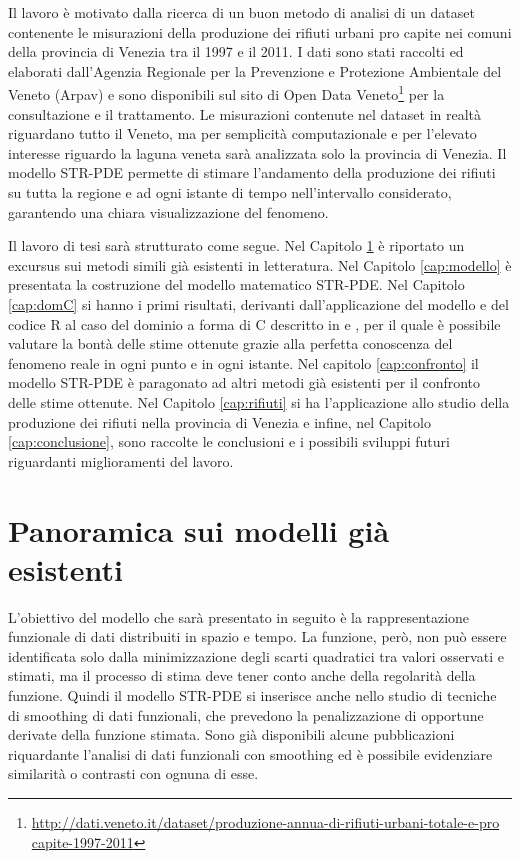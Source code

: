 \documentclass[a4paper,11pt,twoside,openright]{book}							%
\begin{document}
Il lavoro è motivato dalla ricerca di un buon metodo di analisi di un dataset contenente le misurazioni della produzione dei rifiuti urbani pro capite nei comuni della provincia di Venezia tra il 1997 e il 2011. I dati sono stati raccolti ed elaborati dall'Agenzia Regionale per la Prevenzione e Protezione Ambientale del Veneto (Arpav) e sono disponibili sul sito di Open Data Veneto\footnote{\href{http://dati.veneto.it/dataset/produzione-annua-di-rifiuti-urbani-totale-e-pro capite-1997-2011}{http://dati.veneto.it/dataset/produzione-annua-di-rifiuti-urbani-totale-e-pro capite-1997-2011}} per la consultazione e il trattamento. Le misurazioni contenute nel dataset in realtà riguardano tutto il Veneto, ma per semplicità computazionale e per l'elevato interesse riguardo la laguna veneta sarà analizzata solo la provincia di Venezia. Il modello STR-PDE permette di stimare l'andamento della produzione dei rifiuti su tutta la regione e ad ogni istante di tempo nell'intervallo considerato, garantendo una chiara visualizzazione del fenomeno.

Il lavoro di tesi sarà strutturato come segue. Nel Capitolo \ref{cap:panoramica} è riportato un excursus sui metodi simili già esistenti in letteratura. Nel Capitolo \ref{cap:modello} è presentata la costruzione del modello matematico STR-PDE. Nel Capitolo \ref{cap:domC} si hanno i primi risultati, derivanti dall'applicazione del modello e del codice R al caso del dominio a forma di C descritto in \cite{art:ramsay} e \cite{art:wood}, per il quale è possibile valutare la bontà delle stime ottenute grazie alla perfetta conoscenza del fenomeno reale in ogni punto e in ogni istante. Nel capitolo \ref{cap:confronto} il modello STR-PDE è paragonato ad altri metodi già esistenti per il confronto delle stime ottenute. Nel Capitolo \ref{cap:rifiuti} si ha l'applicazione allo studio della produzione dei rifiuti nella provincia di Venezia e infine, nel Capitolo \ref{cap:conclusione}, sono raccolte le conclusioni e i possibili sviluppi futuri riguardanti miglioramenti del lavoro.



\chapter{Panoramica sui modelli già esistenti}
\label{cap:panoramica}

L'obiettivo del modello che sarà presentato in seguito è la rappresentazione funzionale di dati distribuiti in spazio e tempo. La funzione, però, non può essere identificata solo dalla minimizzazione degli scarti quadratici tra valori osservati e stimati, ma il processo di stima deve tener conto anche della regolarità della funzione. Quindi il modello STR-PDE si inserisce anche nello studio di tecniche di smoothing di dati funzionali, che prevedono la penalizzazione di opportune derivate della funzione stimata. Sono già disponibili alcune pubblicazioni riquardante l'analisi di dati funzionali con smoothing ed è possibile evidenziare similarità o contrasti con ognuna di esse. 
\end{document}
